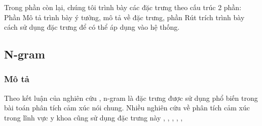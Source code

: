 Trong phần còn lại, chúng tôi trình bày các đặc trưng theo cấu trúc 2 phần: Phần Mô tả trình bày ý tưởng, mô tả về đặc trưng, phần Rút trích trình bày cách sử dụng đặc trưng để có thể áp dụng vào hệ thống.


\subsection{N-gram} \label{sec:ngram}
\subsubsection*{Mô tả}
Theo kết luận của nghiên cứu \cite{chandrakala2012opinion}, n-gram là đặc trưng được sử dụng phổ biến trong bài toán phân tích cảm xúc nói chung. Nhiều nghiên cứu về phân tích cảm xúc trong lĩnh vực y khoa cũng sử dụng đặc trưng này \cite{pang2002thumbs}, \cite{niu2005analysis}, \cite{sarker2011outcome}, \cite{niu2006using}, \cite{pestian2012sentie}, \cite{xia09improving} \\

